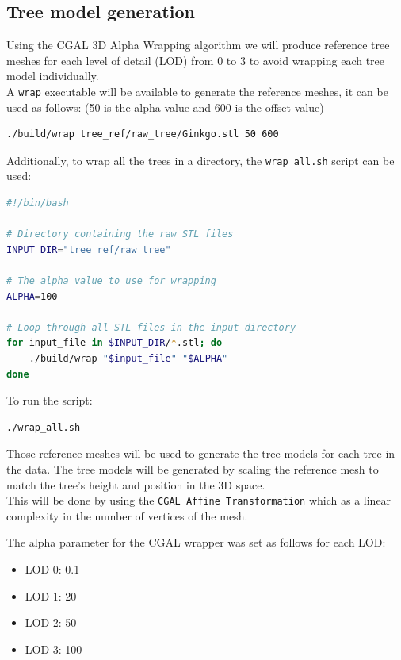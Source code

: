 \documentclass[12pt]{article}
\begin{document}
\subsection{Tree model generation}
Using the CGAL 3D Alpha Wrapping \cite{cgal_alpha_wrapper} algorithm we will produce
reference tree meshes for each level of detail (LOD) from 0 to 3 to avoid wrapping
each tree model individually. \\

A \texttt{wrap} executable will be available to generate the reference meshes, it
can be used as follows:
(50 is the alpha value and 600 is the offset value)

\begin{lstlisting}[language=bash]
./build/wrap tree_ref/raw_tree/Ginkgo.stl 50 600
\end{lstlisting}


Additionally, to wrap all the trees in a directory, the \texttt{wrap\_all.sh} script
can be used:

\begin{lstlisting}[language=bash]
#!/bin/bash

# Directory containing the raw STL files
INPUT_DIR="tree_ref/raw_tree"

# The alpha value to use for wrapping
ALPHA=100

# Loop through all STL files in the input directory
for input_file in $INPUT_DIR/*.stl; do
	./build/wrap "$input_file" "$ALPHA"
done
\end{lstlisting}

To run the script:
\begin{lstlisting}
./wrap_all.sh
\end{lstlisting}

Those reference meshes will be used to generate the tree models for each tree
in the data. The tree models will be generated by scaling the reference mesh
to match the tree's height and position in the 3D space. \\
This will be done by using the \texttt{CGAL Affine Transformation} \cite{cgal_affine_transformation}
which as a linear complexity in the number of vertices of the mesh.

The alpha parameter for the CGAL wrapper was set as follows for each LOD:

\begin{itemize}
    \item LOD 0: 0.1
    \item LOD 1: 20
    \item LOD 2: 50
    \item LOD 3: 100
\end{itemize}
\end{document}
